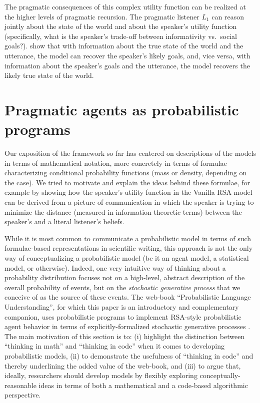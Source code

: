 \documentclass{sp}
\begin{document}
The pragmatic consequences of this complex utility function can be realized at the higher levels of pragmatic recursion.
The pragmatic listener $L_1$ can reason jointly about the state of the world and about the speaker's utility function (specifically, what is the speaker's trade-off between informativity vs.~social goals?). \cite{yoonetal2016} show that with information about the true state of the world and the utterance, the model can recover the speaker's likely goals, and, vice versa, with information about the speaker's goals and the utterance, the model recovers the likely true state of the world.

\section{Pragmatic agents as probabilistic programs} \label{prob-programs}

Our exposition of the framework so far has centered on descriptions of the models in terms of mathematical notation, more concretely in terms of formulae characterizing conditional probability functions (mass or density, depending on the case).
We tried to motivate and explain the ideas behind these formulae, for example by showing how the speaker's utility function in the Vanilla RSA model can be derived from a picture of communication in which the speaker is trying to minimize the distance (measured in information-theoretic terms) between the speaker's and a literal listener's beliefs.

While it is most common to communicate a probabilistic model in terms of such formulae-based representations in scientific writing, this approach is not the only way of conceptualizing a probabilistic model (be it an agent model, a statistical model, or otherwise).
Indeed, one very intuitive way of thinking about a probability distribution focuses not on a high-level, abstract description of the overall probability of events, but on the \emph{stochastic generative process} that we conceive of as the source of these events.
The web-book ``Probabilistic Language Understanding'', for which this paper is an introductory and complementary companion, uses probabilistic programs to implement RSA-style probabilistic agent behavior in terms of explicitly-formalized stochastic generative processes \citep{problang}.
The main motivation of this section is to: (i) highlight the distinction between ``thinking in math'' and ``thinking in code'' when it comes to developing probabilistic models, (ii) to demonstrate the usefulness of ``thinking in code'' and thereby underlining the added value of the web-book, and (iii) to argue that, ideally, researchers should develop models by flexibly exploring conceptually-reasonable ideas in terms of both a mathematical and a code-based algorithmic perspective.
\end{document}

